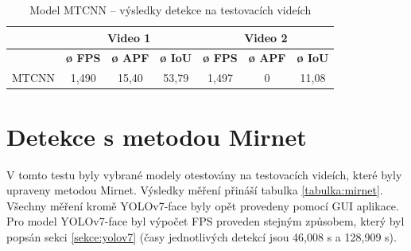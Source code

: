 \begin{table}[H]
  \centering
  \begin{tabular}{c|ccc|ccc|}
  \cline{2-7}
                                                               & \multicolumn{3}{c|}{\cellcolor[HTML]{CBCEFB}\textbf{Video 1}}                                                                              & \multicolumn{3}{c|}{\cellcolor[HTML]{CBCEFB}\textbf{Video 2}}                                                                              \\ \hline
  \rowcolor[HTML]{E0DBDB} 
  \multicolumn{1}{|c|}{\cellcolor[HTML]{E0DBDB}\textbf{Model}} & \multicolumn{1}{c|}{\cellcolor[HTML]{E0DBDB}\textbf{ø FPS}} & \multicolumn{1}{c|}{\cellcolor[HTML]{E0DBDB}\textbf{ø APF}} & \textbf{ø IoU} & \multicolumn{1}{c|}{\cellcolor[HTML]{E0DBDB}\textbf{ø FPS}} & \multicolumn{1}{c|}{\cellcolor[HTML]{E0DBDB}\textbf{ø APF}} & \textbf{ø IoU} \\ \hline
  \multicolumn{1}{|c|}{\cellcolor[HTML]{E0DBDB}MTCNN}          & \multicolumn{1}{c|}{1,490}                                  & \multicolumn{1}{c|}{15,40}                                  & 53,79          & \multicolumn{1}{c|}{1,497}                                  & \multicolumn{1}{c|}{0}                                      & 11,08          \\ \hline
  \end{tabular}
  \label{tabulka:mtcnnvidea}
  \caption{Model MTCNN -- výsledky detekce na testovacích videích}
\end{table}

\section{Detekce s metodou Mirnet}
\label{sekce:mirnetexperimenty}
V tomto testu byly vybrané modely otestovány na testovacích videích, které byly upraveny metodou Mirnet. Výsledky měření přináší tabulka \ref{tabulka:mirnet}. Všechny měření kromě YOLOv7-face byly opět provedeny pomocí GUI aplikace. Pro model YOLOv7-face byl výpočet FPS proveden stejným způsobem, který byl popsán sekci \ref{sekce:yolov7} (časy jednotlivých detekcí jsou 46,008 s a 128,909 s).

